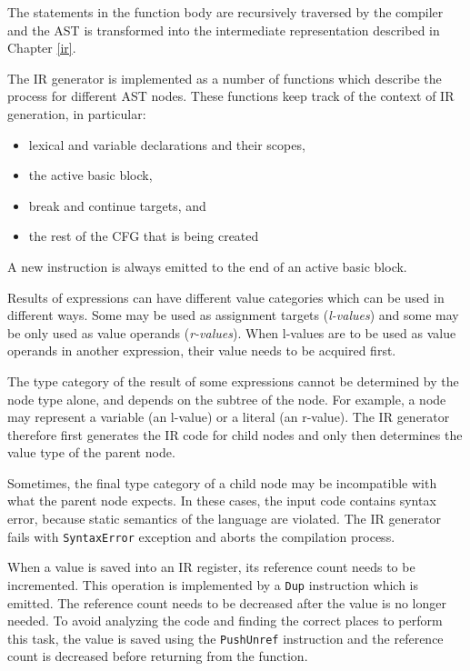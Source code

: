 The statements in the function body are recursively traversed by the compiler and the AST is transformed into the intermediate representation described in Chapter \ref{ir}.

The IR generator is implemented as a number of functions which describe the process for different AST nodes. These functions keep track of the context of IR generation, in particular:

\begin{itemize}
    \item lexical and variable declarations and their scopes,
    \item the active basic block,
    \item break and continue targets, and
    \item the rest of the CFG that is being created
\end{itemize}

A new instruction is always emitted to the end of an active basic block.

Results of expressions can have different value categories which can be used in different ways. Some may be used as assignment targets (\textit{l-values}) and some may be only used as value operands (\textit{r-values}). When l-values are to be used as value operands in another expression, their value needs to be acquired first.

The type category of the result of some expressions cannot be determined by the node type alone, and depends on the subtree of the node. For example, a \nonterminal[PrimaryExpression]{}{} node may represent a variable (an l-value) or a literal (an r-value). The IR generator therefore first generates the IR code for child nodes and only then determines the value type of the parent node.

Sometimes, the final type category of a child node may be incompatible with what the parent node expects. In these cases, the input code contains syntax error, because static semantics of the language are violated. The IR generator fails with \texttt{SyntaxError} exception and aborts the compilation process.

When a value is saved into an IR register, its reference count needs to be incremented. This operation is implemented by a \texttt{Dup} instruction which is emitted. The reference count needs to be decreased after the value is no longer needed. To avoid analyzing the code and finding the correct places to perform this task, the value is saved using the \texttt{PushUnref} instruction and the reference count is decreased before returning from the function.

